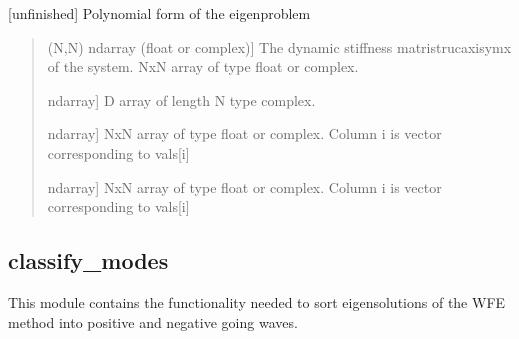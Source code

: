 \documentclass[letterpaper,10pt,english]{sphinxmanual}
\begin{document}

\begin{fulllineitems}
\label{\detokenize{core:pywfe.core.eigensolvers.polynomial}}
\pysigstartsignatures
{}
\pysigstopsignatures
\sphinxAtStartPar
{[}unfinished{]} Polynomial form of the eigenproblem
\begin{quote}\begin{description}
\begin{description}
\sphinxlineitem{\sphinxstylestrong{DSM}}{[}(N,N) ndarray (float or complex){]}
\sphinxAtStartPar
The dynamic stiffness matristrucaxisym\sphinxhyphen{}x of the system. 
NxN array of type float or complex.

\end{description}

\begin{description}
\sphinxlineitem{\sphinxstylestrong{vals}}{[}ndarray{]}
\sphinxhyphen{}D array of length N type complex.

\sphinxlineitem{\sphinxstylestrong{left\_eigenvectors}}{[}ndarray{]}
\sphinxAtStartPar
NxN array of type float or complex.
Column i is vector corresponding to vals{[}i{]}

\sphinxlineitem{\sphinxstylestrong{right\_eigenvectors}}{[}ndarray{]}
\sphinxAtStartPar
NxN array of type float or complex.
Column i is vector corresponding to vals{[}i{]}

\end{description}

\end{description}\end{quote}

\end{fulllineitems}

\label{\detokenize{core:module-pywfe.core.classify_modes}}

\subsection{classify\_modes}
\label{\detokenize{core:classify-modes}}
\sphinxAtStartPar
This module contains the functionality needed to sort eigensolutions of the
WFE method into positive and negative going waves.
\end{document}
